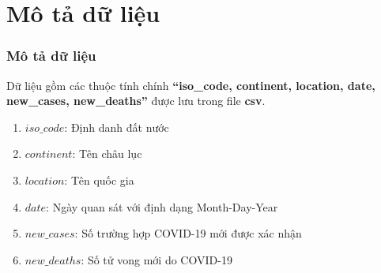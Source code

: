 \documentclass[english,10pt,table]{beamer}
\begin{document}
\section{Mô tả dữ liệu}
\frame
{
    \frametitle{Mô tả dữ liệu}
    \begin{block}{Dữ liệu gồm các thuộc tính chính  {\bf ``iso\_code, continent, location, date, new\_cases,	new\_deaths''} được lưu trong file \textbf{csv}.}
	\begin{enumerate}
		\item $iso\_code$: Định danh đất nước 
		\item $continent$: Tên châu lục
		\item $location$: Tên quốc gia
		\item $date$: Ngày quan sát với định dạng Month-Day-Year
		\item $new\_cases$: Số trường hợp COVID-19 mới được xác nhận 
		\item $new\_deaths$: Số tử vong mới do COVID-19 
	\end{enumerate}
	\end{block}
}
\end{document}

